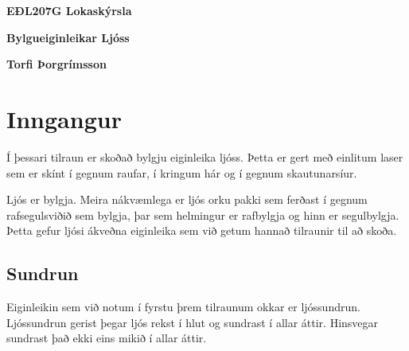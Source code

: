 \documentclass[12pt]{article}
\begin{document}
    
\centerline{\bf \Huge EÐL207G Lokaskýrsla}
\centerline{\bf \large Bylgueiginleikar Ljóss}
\centerline{\bf Torfi Þorgrímsson}

\tableofcontents
\newpage

\section{Inngangur}

Í þessari tilraun er skoðað bylgju eiginleika ljóss. Þetta er gert með einlitum laser sem er skínt í gegnum raufar, í kringum hár og í gegnum skautunarsíur. 

Ljós er bylgja. Meira nákvæmlega er ljós orku pakki sem ferðast í gegnum rafsegulsviðið sem bylgja, þar sem helmingur er rafbylgja og hinn er segulbylgja. Þetta gefur ljósi ákveðna eiginleika sem við getum hannað tilraunir til að skoða. 

\subsection{Sundrun}

Eiginleikin sem við notum í fyrstu þrem tilraunum okkar er ljóssundrun. Ljóssundrun gerist þegar ljós rekst í hlut og sundrast í allar áttir. Hinsvegar sundrast það ekki eins mikið í allar áttir. 
\end{document}
